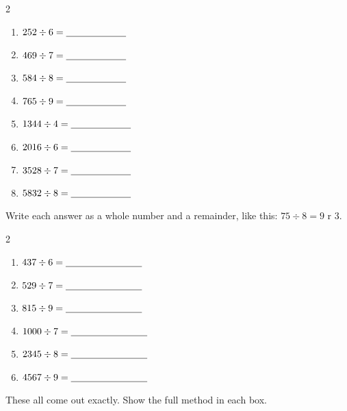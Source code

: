 \documentclass[12pt,a4paper]{article}
\begin{document}

\vspace{2pt}
\begin{multicols}{2}
\begin{enumerate}[label=(\alph*), itemsep=12pt]
  \item $252 \div 6 = \blank[2.2cm]$
  \item $469 \div 7 = \blank[2.2cm]$
  \item $584 \div 8 = \blank[2.2cm]$
  \item $765 \div 9 = \blank[2.2cm]$
  \item $1344 \div 4 = \blank[2.2cm]$
  \item $2016 \div 6 = \blank[2.2cm]$
  \item $3528 \div 7 = \blank[2.2cm]$
  \item $5832 \div 8 = \blank[2.2cm]$
\end{enumerate}
\end{multicols}


\noindent Write each answer as a whole number and a remainder, like this:
\quad $75 \div 8 = 9$ r 3.

\vspace{5pt}
\begin{multicols}{2}
\begin{enumerate}[label=(\alph*), itemsep=12pt]
  \item $437 \div 6 = \blank[2.8cm]$
  \item $529 \div 7 = \blank[2.8cm]$
  \item $815 \div 9 = \blank[2.8cm]$
  \item $1000 \div 7 = \blank[2.8cm]$
  \item $2345 \div 8 = \blank[2.8cm]$
  \item $4567 \div 9 = \blank[2.8cm]$
\end{enumerate}
\end{multicols}


\noindent These all come out exactly. Show the full method in each box.
\end{document}
